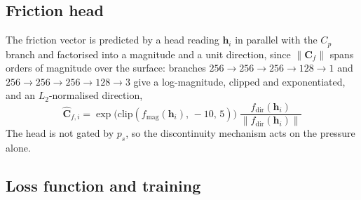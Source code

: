 \documentclass{WCCM-ECCOMAS_2026_Full_Paper}
\begin{document}
\subsection{Friction head}
\label{sec:friction}

The friction vector is predicted by a head reading $\mathbf{h}_i$ in
parallel with the $C_p$ branch and factorised into a magnitude and a
unit direction, since $\|\mathbf{C}_f\|$ spans orders of magnitude
over the surface: branches $256\!\to\!256\!\to\!256\!\to\!128\!\to\!1$
and $256\!\to\!256\!\to\!256\!\to\!128\!\to\!3$ give a log-magnitude,
clipped and exponentiated, and an $L_2$-normalised direction,
\begin{equation}
  \hat{\mathbf{C}}_{f,i} =
    \exp\!\bigl(\mathrm{clip}(f_{\mathrm{mag}}(\mathbf{h}_i),\,-10,\,5)\bigr)\;
    \frac{f_{\mathrm{dir}}(\mathbf{h}_i)}{\|f_{\mathrm{dir}}(\mathbf{h}_i)\|}
  \label{eq:forward_cf}
\end{equation}
The head is not gated by $p_s$, so the discontinuity mechanism acts on
the pressure alone.

\subsection{Loss function and training}
\label{sec:loss}\label{sec:training}
\end{document}
